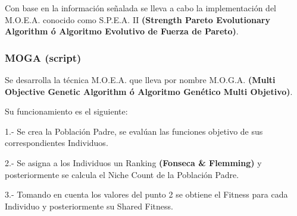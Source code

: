 \documentclass[letterpaper,10pt,english]{sphinxmanual}
\begin{document}
\begin{fulllineitems}
\label{Model/MOEA/SPEAII:Model.MOEA.SPEAII.execute_moea}
Con base en la información señalada se lleva a cabo la implementación del
M.O.E.A. conocido como S.P.E.A. II \textbf{(Strength Pareto Evolutionary Algorithm ó
Algoritmo Evolutivo de Fuerza de Pareto)}.

\end{fulllineitems}



\subsubsection{MOGA (script)}
\label{Model/MOEA/MOGA::doc}\label{Model/MOEA/MOGA:moga-script}
\begin{DUlineblock}{0em}
\item[] Se desarrolla la técnica M.O.E.A. que lleva por nombre M.O.G.A.
\textbf{(Multi Objective Genetic Algorithm ó Algoritmo Genético Multi Objetivo)}.
\item[] Su funcionamiento es el siguiente:
\item[] 
\item[] 1.- Se crea la Población Padre, se evalúan las funciones objetivo de sus correspondientes Individuos.
\end{DUlineblock}

\begin{DUlineblock}{0em}
\item[] 2.- Se asigna a los Individuos un Ranking \textbf{(Fonseca \& Flemming)} y posteriormente se calcula el Niche Count de la Población Padre.
\end{DUlineblock}

\begin{DUlineblock}{0em}
\item[] 3.- Tomando en cuenta los valores del punto 2 se obtiene el Fitness para cada Individuo y posteriormente su Shared Fitness.
\end{DUlineblock}
\end{document}
